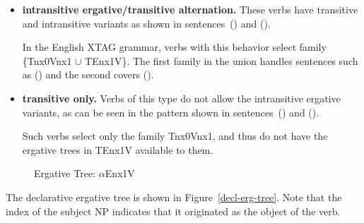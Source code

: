 \begin{itemize}
\item {\bf intransitive ergative/transitive alternation.}  These verbs
have transitive and intransitive variants as shown in sentences~() and
().


In the English XTAG grammar, verbs with this behavior select family
\{Tnx0Vnx1 $\cup$ TEnx1V\}.  The first family in the union handles
sentences such as () and the second covers ().

\item {\bf transitive only.}  Verbs of this type do not allow the
intransitive ergative variants, as can be seen in the pattern shown in
sentences~() and ().


Such verbs select only the family Tnx0Vnx1, and thus do not have the
ergative trees in TEnx1V available to them.


\end{itemize}

\begin{figure}[htb]
\centering
\mbox{}
\caption{Ergative Tree: $\alpha$Enx1V}
\label{decl-erg-tree}
\label{2;14,1}
\end{figure}

The declarative ergative tree is shown in Figure~\ref{decl-erg-tree}.
Note that the index of the subject NP indicates that it originated as
the object of the verb.























